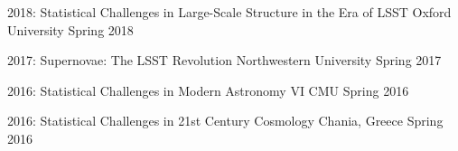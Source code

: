 \documentclass[11pt,letterpaper]{article}
\begin{document}
\begin{list}{}{\malzlist}
\item 2018: 
{Statistical Challenges in Large-Scale Structure in the Era of LSST}
{Oxford University}
{Spring 2018}
\item 2017: 
{Supernovae: The LSST Revolution}
{Northwestern University}
{Spring 2017}
\item 2016: 
{Statistical Challenges in Modern Astronomy VI}
{CMU}
{Spring 2016}
\item 2016: 
{Statistical Challenges in 21st Century Cosmology}
{Chania, Greece}
{Spring 2016}
\end{list}

%
\end{document}
